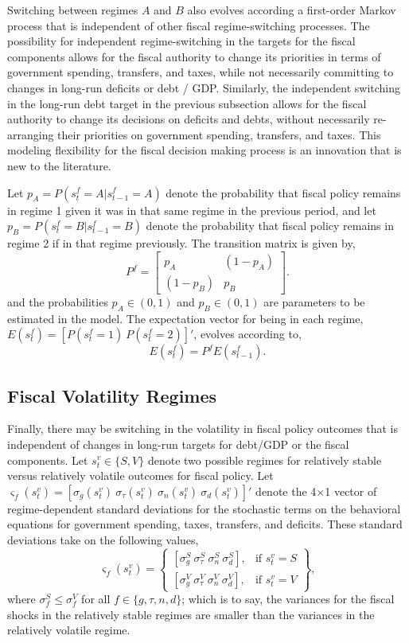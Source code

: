 \documentclass[11pt]{article}
\newcommand{\beq}{\begin{equation}}
\newcommand{\eeq}{\end{equation}}
\newcommand{\bdm}{\begin{displaymath}}
\newcommand{\edm}{\end{displaymath}}
\begin{document}
Switching between regimes $A$ and $B$ also evolves according a first-order Markov process that is independent of other fiscal regime-switching processes.  The possibility for independent regime-switching in the targets for the fiscal components allows for the fiscal authority to change its priorities in terms of government spending, transfers, and taxes, while not necessarily committing to changes in long-run deficits or debt / GDP.  Similarly, the independent switching in the long-run debt target in the previous subsection allows for the fiscal authority to change its decisions on deficits and debts, without necessarily re-arranging their priorities on government spending, transfers, and taxes.  This modeling flexibility for the fiscal decision making process is an innovation that is new to the literature.

Let $p_A = P(s_t^f = A | s_{t-1}^f = A)$ denote the probability that fiscal policy remains in regime 1 given it was in that same regime in the previous period, and let $p_B = P(s_t^f = B | s_{t-1}^f = B)$ denote the probability that fiscal policy remains in regime 2 if in that regime previously.  The transition matrix is given by,
\beq P^f = \left[ \begin{array}{cc} p_A & (1-p_A) \\ (1-p_B) & p_B \end{array} \right]. \eeq
and the probabilities  $p_A \in (0,1)$ and $p_B \in (0,1)$ are parameters to be estimated in the model. The expectation vector for being in each regime, $E(s_t^f) = [ P(s_t^f=1) ~ P(s_t^f=2)]'$, evolves according to,
\bdm E(s_t^f) = P^f E(s_{t-1}^f). \edm

\subsection{Fiscal Volatility Regimes}

Finally, there may be switching in the volatility in fiscal policy outcomes that is independent of changes in long-run targets for debt/GDP or the fiscal components.  Let $s_t^v \in \{S,V\}$ denote two possible regimes for relatively stable versus relatively volatile outcomes for fiscal policy.  Let $\varsigma_f(s_t^v) = [\sigma_g(s_t^v)~ \sigma_\tau(s_t^v)~ \sigma_n(s_t^v)~ \sigma_d(s_t^v)]'$ denote the 4$\times$1 vector of regime-dependent standard deviations for the stochastic terms on the behavioral equations for government spending, taxes, transfers, and deficits.  These standard deviations take on the following values,
\beq \varsigma_f(s_t^v) = \left\{ \begin{array}{ll} \left[\sigma_{g}^{S}~ \sigma_{\tau}^{S}~ \sigma_{n}^{S}~ \sigma_{d}^{S}\right], & \mbox{if } s_t^v = S \\  \left[\sigma_{g}^{V}~ \sigma_{\tau}^{V}~ \sigma_{n}^{V}~ \sigma_{d}^{V}\right], & \mbox{if } s_t^v = V \end{array} \right\}, \eeq
where $\sigma_{f}^{S} \leq \sigma_{f}^{V}$ for all $f \in \{g,\tau,n,d\}$; which is to say, the variances for the fiscal shocks in the relatively stable regimes are smaller than the variances in the relatively volatile regime.
\end{document}
